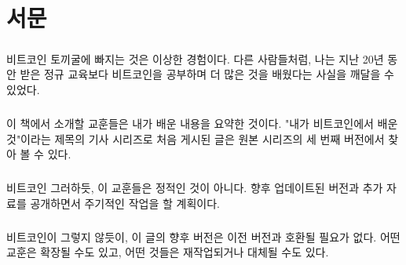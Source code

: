 \chapter*{서문}

\paragraph{}
비트코인 토끼굴에 빠지는 것은 이상한 경험이다. 
다른 사람들처럼, 나는 지난 20년 동안 받은 정규 교육보다 비트코인을 공부하며 더 많은 것을 배웠다는 사실을 깨달을 수 있었다.

\paragraph{}
이 책에서 소개할 교훈들은 내가 배운 내용을 요약한 것이다. "내가 비트코인에서 배운 것"이라는 제목의 기사 시리즈로 처음 게시된 글은 원본 시리즈의 세 번째 버전에서 찾아 볼 수 있다.

\paragraph{}
비트코인 그러하듯, 이 교훈들은 정적인 것이 아니다.
향후 업데이트된 버전과 추가 자료를 공개하면서 주기적인 작업을 할 계획이다.

\paragraph{}
비트코인이 그렇지 않듯이, 이 글의 향후 버전은 이전 버전과 호환될 필요가 없다.
어떤 교훈은 확장될 수도 있고, 어떤 것들은 재작업되거나 대체될 수도 있다. 

